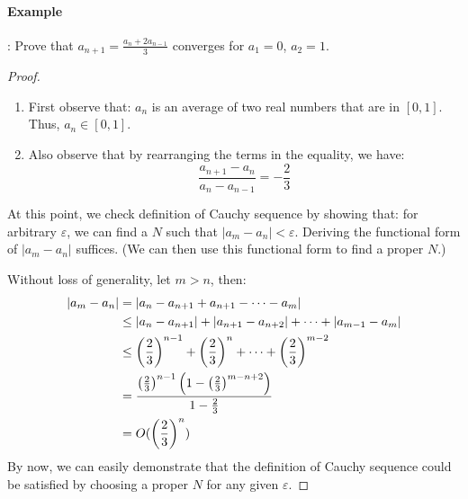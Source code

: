 \documentclass[12pt]{article}
\renewcommand{\epsilon}{\varepsilon}
\theoremstyle{definition}
\theoremstyle{plain}
\begin{document}
\paragraph{Example}:
Prove that $a_{n+1} = \frac{a_n + 2a_{n-1}}{3}$ converges for $a_1 = 0$, $a_2 = 1$.

\begin{proof}
    \begin{enumerate}[Step 1]
        \item First observe that: $a_n$ is an average of two real numbers that are in $[0,1]$. Thus,
            $a_n \in [0,1]$.

        \item Also observe that by rearranging the terms in the equality, we
            have:
            \[
                \frac{a_{n+1} - a_n}{a_n - a_{n-1}} = - \frac{2}{3}
            \]
    \end{enumerate}
    At this point, we check definition of Cauchy sequence by showing that: for
    arbitrary $\epsilon$, we can find a $N$ such that $|a_m - a_n| <
    \varepsilon$. Deriving the functional form of $|a_m  -a_n|$ suffices. (We
    can then use this functional form to find a proper $N$.)

    Without loss of generality, let $m > n$, then:
    \[
        \aligned
        |a_m - a_n|& = |a_n - a_{n+1} + a_{n+1} - \cdots - a_m|\\
        & \le |a_n - a_{n+1}| + |a_{n+1} - a_{n+2} | + \cdots + |a_{m-1} - a_m|
        \\
        & \le \left( \frac{2}{3} \right)^{n-1} + \left( \frac{2}{3} \right)^n +
        \cdots + \left( \frac{2}{3} \right)^{m-2} \\
        & = \frac{\left( \frac{2}{3} \right)^{n-1}\left( 1 - \left(
                    \frac{2}{3}
        \right)^{m-n+2} \right)}{1 -  \frac{2}{3}} \\
        & = O(\left( \frac{2}{3} \right)^n)
        \endaligned
    \]
    By now, we can easily demonstrate that the definition of Cauchy sequence
    could be satisfied by choosing a proper $N$ for any given
    $\varepsilon$.
\end{proof}
\end{document}
